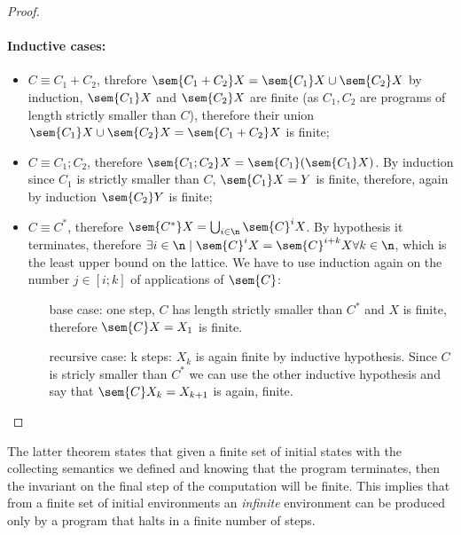 \begin{proof}
  \paragraph*{Inductive cases: \\}
  \begin{itemize}
  \item \(C \equiv C_1 + C_2\), threfore \(\sem{C_1 +C_2}X =
    \sem{C_1}X \cup \sem{C_2}X\) by induction, \(\sem{C_1}X\) and
    \(\sem{C_2}X\) are finite (as \(C_1, C_2\) are programs of length
    strictly smaller than \(C\)), therefore their union \(\sem{C_1}X
    \cup \sem{C_2}X = \sem{C_1 +C_2}X\) is finite;
  \item \(C \equiv C_1; C_2\), therefore \(\sem{C_1;C_2}X =
    \sem{C_1}(\sem{C_1}X)\). By induction since \(C_1\) is strictly
    smaller than \(C\), \(\sem{C_1}X = Y\) is finite, therefore, again
    by induction \(\sem{C_2}Y\) is finite;
  \item \(C \equiv C^*\), therefore \(\sem{C^*}X =
    \bigcup_{i\in\n}\sem{C}^iX\). By hypothesis it terminates,
    therefore \(\exists i \in \n \mid \sem{C}^iX = \sem{C}^{i+k}X
    \forall k \in \n\), which is the least upper bound on the
    lattice. We have to use induction again on the number \(j \in
    [i;k]\) of applications of \(\sem{C}\):
    \begin{itemize}
    \item[base case:] one step, \(C\) has length strictly smaller than
      \(C^*\) and \(X\) is finite, therefore \(\sem{C}X = X_1\) is finite.
    \item[recursive case:] k steps: \(X_k\) is again finite by
      inductive hypothesis. Since \(C\) is stricly smaller than
      \(C^*\) we can use the other inductive hypothesis and say that
      \(\sem{C}X_k = X_{k+1}\) is again, finite.
    \end{itemize}
  \end{itemize}
\end{proof}

\begin{observation}
  The latter theorem states that given a finite set of initial states
  with the collecting semantics we defined and knowing that the
  program terminates, then the invariant on the final step of the
  computation will be finite. This implies that from a finite set of
  initial environments an \emph{infinite} environment can be produced
  only by a program that halts in a finite number of steps.
\end{observation}

